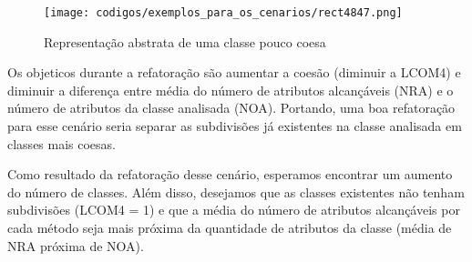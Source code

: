 	\begin{figure}[htb]
		\centering
		\texttt{[image: codigos/exemplos\_para\_os\_cenarios/rect4847.png]}
		\caption{Representação abstrata de uma classe pouco coesa}
		\label{classe_pouco_coesa}
	\end{figure}
	
	Os objeticos durante a refatoração são aumentar a coesão (diminuir a LCOM4) e diminuir a diferença entre média do número de atributos alcançáveis (NRA) e o número de atributos da classe analisada (NOA). Portando, uma boa refatoração para esse cenário seria separar as subdivisões já existentes na classe analisada em classes mais coesas.
	
	Como resultado da refatoração desse cenário, esperamos encontrar um aumento do número de classes. Além disso, desejamos que as classes existentes não tenham subdivisões (LCOM4 = 1) e que a média do número de atributos alcançáveis por cada método seja mais próxima da quantidade de atributos da classe (média de NRA próxima de NOA).
                  





